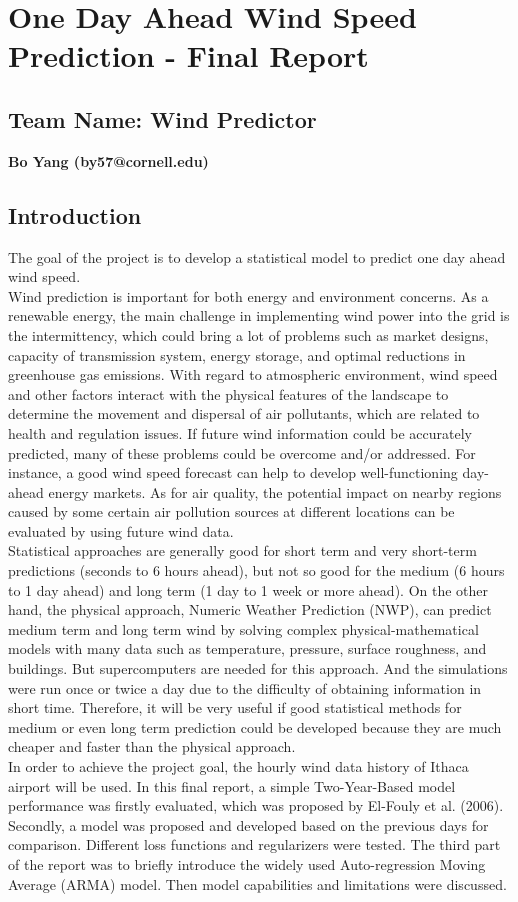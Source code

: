 \documentclass{article}
\begin{document}
\section*{One Day Ahead Wind Speed Prediction - Final Report}
\subsection*{Team Name: Wind Predictor} 
{\bf Bo Yang (by57@cornell.edu)}\\

\subsection*{Introduction}
The goal of the project is to develop a statistical model to predict one day ahead wind speed.\\
Wind prediction is important for both energy and environment concerns. As a renewable energy, the main challenge in implementing wind power into the grid is the intermittency, which could bring a lot of problems such as market designs, capacity of transmission system, energy storage, and optimal reductions in greenhouse gas emissions.  With regard to atmospheric environment, wind speed and other factors interact with the physical features of the landscape to determine the movement and dispersal of air pollutants, which are related to health and regulation issues.  If future wind information could be accurately predicted, many of these problems could be overcome and/or addressed. For instance, a good wind speed forecast can help to develop well-functioning day-ahead energy markets. As for air quality, the potential impact on nearby regions caused by some certain air pollution sources at different locations can be evaluated by using future wind data.\\
Statistical approaches are generally good for short term and very short-term predictions (seconds to 6 hours ahead), but not so good for the medium (6 hours to 1 day ahead) and long term (1 day to 1 week or more ahead).  On the other hand, the physical approach, Numeric Weather Prediction (NWP), can predict medium term and long term wind by solving complex physical-mathematical models with many data such as temperature, pressure, surface roughness, and buildings.  But supercomputers are needed for this approach.  And the simulations were run once or twice a day due to the difficulty of obtaining information in short time.  Therefore, it will be very useful if good statistical methods for medium or even long term prediction could be developed because they are much cheaper and faster than the physical approach.\\
In order to achieve the project goal, the hourly wind data history of Ithaca airport will be used.  In this final report, a simple Two-Year-Based model performance was firstly evaluated, which was proposed by El-Fouly et al. (2006).  Secondly, a model was proposed and developed based on the previous days for comparison.  Different loss functions and regularizers were tested.  The third part of the report was to briefly introduce the widely used Auto-regression Moving Average (ARMA) model.  Then model capabilities and limitations were discussed.\\
\end{document}
